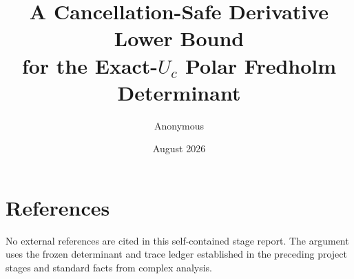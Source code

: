 \documentclass[11pt]{article}
\title{A Cancellation-Safe Derivative Lower Bound\\
for the Exact-\(U_c\) Polar Fredholm Determinant}
\author{Anonymous}
\date{August 2026}
\begin{document}
\maketitle
\begin{abstract}

\end{abstract}






\appendix

\section*{References}
No external references are cited in this self-contained stage report.  The
argument uses the frozen determinant and trace ledger established in the
preceding project stages and standard facts from complex analysis.
\end{document}
